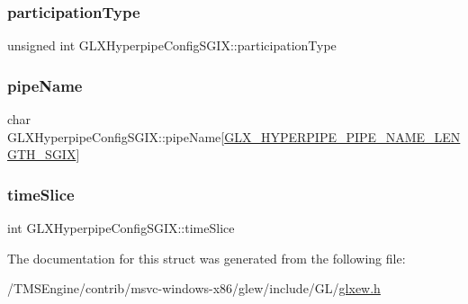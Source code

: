 \subsubsection{\texorpdfstring{participation\+Type}{participationType}}
{\footnotesize\ttfamily unsigned int G\+L\+X\+Hyperpipe\+Config\+S\+G\+I\+X\+::participation\+Type}

\mbox{\label{struct_g_l_x_hyperpipe_config_s_g_i_x_a9e3748f92005cac81cb44d4c67acccb8}} 
\subsubsection{\texorpdfstring{pipe\+Name}{pipeName}}
{\footnotesize\ttfamily char G\+L\+X\+Hyperpipe\+Config\+S\+G\+I\+X\+::pipe\+Name\mbox{[}\hyperlink{glxew_8h_ae1c8261c0861010d8003a31d07e26005}{G\+L\+X\+\_\+\+H\+Y\+P\+E\+R\+P\+I\+P\+E\+\_\+\+P\+I\+P\+E\+\_\+\+N\+A\+M\+E\+\_\+\+L\+E\+N\+G\+T\+H\+\_\+\+S\+G\+IX}\mbox{]}}

\mbox{\label{struct_g_l_x_hyperpipe_config_s_g_i_x_afe9288e75dc1ae5e0f33eff978d7024d}} 
\subsubsection{\texorpdfstring{time\+Slice}{timeSlice}}
{\footnotesize\ttfamily int G\+L\+X\+Hyperpipe\+Config\+S\+G\+I\+X\+::time\+Slice}



The documentation for this struct was generated from the following file\+:\begin{DoxyCompactItemize}
\item 
/\+T\+M\+S\+Engine/contrib/msvc-\/windows-\/x86/glew/include/\+G\+L/\hyperlink{glxew_8h}{glxew.\+h}\end{DoxyCompactItemize}

